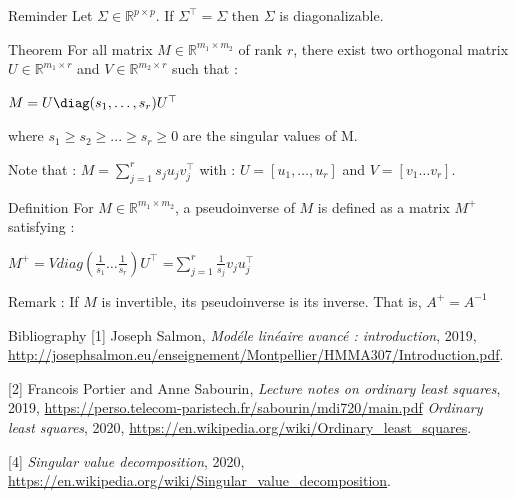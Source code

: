 \documentclass[unknownkeysallowed]{beamer}
\begin{document}
\begin{frame}
\begin{block}{Reminder}
Let $\Sigma\in\mathbb{R}^{p \times p}$.
If $\Sigma^{\top}=\Sigma$ then $\Sigma$ is diagonalizable.
\end{block}
\begin{alertblock}{Theorem}
For all matrix $M\in\mathbb{R}^{m_1 \times m_2}$ of rank $r$, there exist two orthogonal matrix $U\in \mathbb{R}^{m_1 \times r}$ and $V\in\mathbb{R}^{m_2 \times r}$ such that :
\begin{center}
    $M=U \diag(s_{1},\dots, s_{r})U^{\top}$
\end{center}
where $s_{1}\ge s_{2} \ge ... \ge s_{r} \ge 0$ are the singular values of M.
\end{alertblock}
\vspace{0.5cm}
Note that : $M=\sum_{j=1}^r s_{j}u_{j}v_{j}^{\top}$ with : $U=[u_{1},\dots,u_{r}]$ and $V=[v_{1} \dots v_{r}]$.
\end{frame}

\begin{frame}
\begin{block}{Definition}
For $M\in\mathbb{R}^{m_1 \times m_2}$, a pseudoinverse of $M$ is defined as a matrix $M^{+}$ satisfying :
\begin{center}
    $M^{+}=Vdiag(\frac{1}{s_{1}} \dots \frac{1}{s_{r}})U^{\top}$
    =$\sum\limits_{j=1}^r \frac{1}{s_{j}}v_{j}u_{j}^{\top}$
\end{center}
\end{block}
\vspace{0.5cm}
Remark : If $M$ is invertible, its pseudoinverse is its inverse. That is, $A^{+}=A^{-1}$
\end{frame}

\begin{frame}{Bibliography}
[1] Joseph Salmon, \textit{Modéle linéaire avancé : introduction}, 2019, \url{http://josephsalmon.eu/enseignement/Montpellier/HMMA307/Introduction.pdf}.
\newline

[2] Francois Portier and Anne Sabourin, \textit{Lecture notes on ordinary least squares}, 2019, \url{https://perso.telecom-paristech.fr/sabourin/mdi720/main.pdf}
\newline
\newline
[3] \textit{Ordinary least squares}, 2020,
\url{https://en.wikipedia.org/wiki/Ordinary_least_squares}.
\newline

[4] \textit{Singular value decomposition}, 2020,
\url{https://en.wikipedia.org/wiki/Singular_value_decomposition}.



\end{frame}
\end{document}
